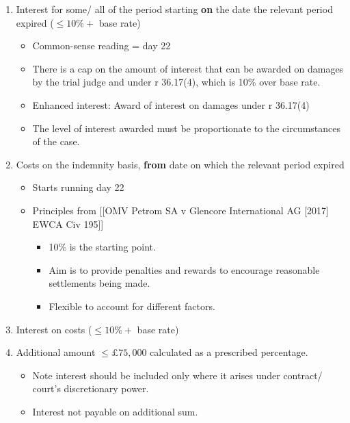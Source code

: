 \documentclass[
]{article}
\providecommand{\tightlist}{%
  \setlength{\itemsep}{0pt}\setlength{\parskip}{0pt}}
\begin{document}
\begin{enumerate}
\def\labelenumi{\arabic{enumi}.}
\tightlist
\item
  Interest for some/ all of the period starting \textbf{on} the date the
  relevant period expired (\(\leq 10\% +\) base rate)

  \begin{itemize}
  \tightlist
  \item
    Common-sense reading = day 22
  \item
    There is a cap on the amount of interest that can be awarded on
    damages by the trial judge and under r 36.17(4), which is 10\% over
    base rate.
  \item
    Enhanced interest: Award of interest on damages under r 36.17(4)
  \item
    The level of interest awarded must be proportionate to the
    circumstances of the case.
  \end{itemize}
\item
  Costs on the indemnity basis, \textbf{from} date on which the relevant
  period expired

  \begin{itemize}
  \tightlist
  \item
    Starts running day 22
  \item
    Principles from {[}{[}OMV Petrom SA v Glencore International AG
    {[}2017{]} EWCA Civ 195{]}{]}

    \begin{itemize}
    \tightlist
    \item
      10\% is the starting point.
    \item
      Aim is to provide penalties and rewards to encourage reasonable
      settlements being made.
    \item
      Flexible to account for different factors.
    \end{itemize}
  \end{itemize}
\item
  Interest on costs (\(\leq 10\% +\) base rate)
\item
  Additional amount \(\leq £75,000\) calculated as a prescribed
  percentage.

  \begin{itemize}
  \tightlist
  \item
    Note interest should be included only where it arises under
    contract/ court's discretionary power.
  \item
    Interest not payable on additional sum.
  \end{itemize}
\end{enumerate}
\end{document}

